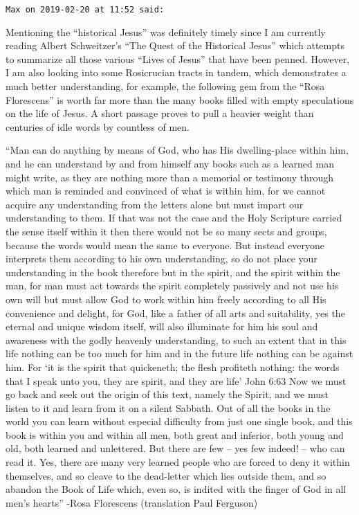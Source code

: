 \begin{footnotesize}
\begin{sffamily}
\texttt{Max on 2019-02-20 at 11:52 said:}

Mentioning the ``historical Jesus'' was definitely timely since I am currently reading Albert Schweitzer's ``The Quest of the Historical Jesus'' which attempts to summarize all those various ``Lives of Jesus'' that have been penned. However, I am also looking into some Rosicrucian tracts in tandem, which demonstrates a much better understanding, for example, the following gem from the ``Rosa Florescens'' is worth far more than the many books filled with empty speculations on the life of Jesus. A short passage proves to pull a heavier weight than centuries of idle words by countless of men.

``Man can do anything by means of God, who has His dwelling-place within him, and he can understand by and from himself any books such as a learned man might write, as they are nothing more than a memorial or testimony through which man is reminded and convinced of what is within him, for we cannot acquire any understanding from the letters alone but must impart our understanding to them. If that was not the case and the Holy Scripture carried the sense itself within it then there would not be so many sects and groups, because the words would mean the same to everyone. But instead everyone interprets them according to his own understanding, so do not place your understanding in the book therefore but in the spirit, and the spirit within the man, for man must act towards the spirit completely passively and not use his own will but must allow God to work within him freely according to all His convenience and delight, for God, like a father of all arts and suitability, yes the eternal and unique wisdom itself, will also illuminate for him his soul and awareness with the godly heavenly understanding, to such an extent that in this life nothing can be too much for him and in the future life nothing can be against him. For `it is the spirit that quickeneth; the flesh profiteth nothing: the words that I speak unto you, they are spirit, and they are life' John 6:63 Now we must go back and seek out the origin of this text, namely the Spirit, and we must listen to it and learn from it on a silent Sabbath. Out of all the books in the world you can learn without especial difficulty from just one single book, and this book is within you and within all men, both great and inferior, both young and old, both learned and unlettered. But there are few -- yes few indeed! -- who can read it. Yes, there are many very learned people who are forced to deny it within themselves, and so cleave to the dead-letter which lies outside them, and so abandon the Book of Life which, even so, is indited with the finger of God in all men's hearts'' -Rosa Florescens (translation Paul Ferguson)


\end{sffamily}
\end{footnotesize}
